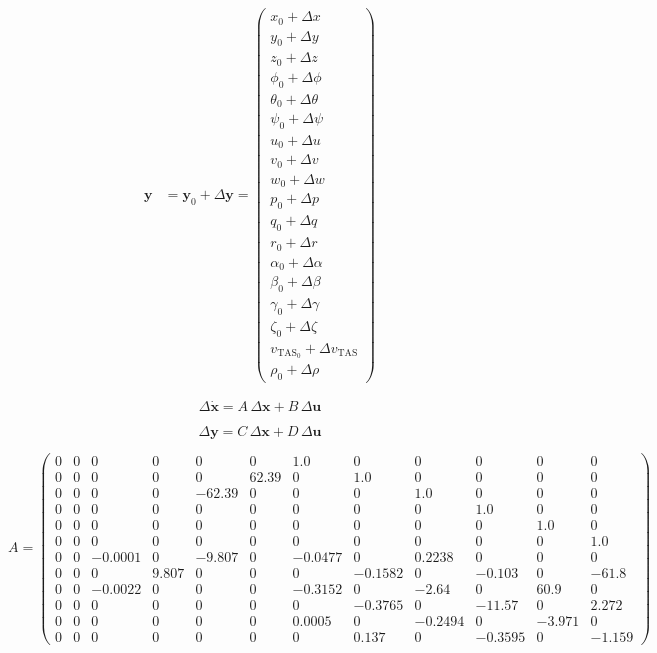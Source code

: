 \documentclass{article}
\begin{document}
\begin{dmath}
\begin{aligned}
\bm{y}&=\bm{y}_0+\Delta \bm{y}=\left(\begin{array}{c} x_0 + \Delta x\\ y_0 + \Delta y\\ z_0 + \Delta z\\ \phi_0 + \Delta \phi \\ \theta_0 + \Delta \theta \\ \psi_0 + \Delta \psi \\ u_0 + \Delta u\\ v_0 + \Delta v\\ w_0 + \Delta w\\ p_0 + \Delta p\\ q_0 + \Delta q\\ r_0 + \Delta r\\ \alpha_0 + \Delta \alpha \\ \beta_0 + \Delta \beta \\ \gamma_0 + \Delta \gamma \\ \zeta_0 + \Delta \zeta\\ v_{\mathrm{TAS}_0} + \Delta v_{\mathrm{TAS}}\\ \rho_0 + \Delta \rho  \end{array}\right)
\end{aligned}
\end{dmath}

\newpage

\begin{dmath}
\Delta \bm{\dot{x}} = A\,\Delta\bm{x} + B\,\Delta\bm{u}
\end{dmath}

\begin{dmath}
\Delta\bm{y} = C\,\Delta\bm{x} + D\,\Delta\bm{u}
\end{dmath}

\begin{dmath}
A = \left(\begin{array}{cccccccccccc} 0 & 0 & 0 & 0 & 0 & 0 & 1.0 & 0 & 0 & 0 & 0 & 0\\ 0 & 0 & 0 & 0 & 0 & 62.39 & 0 & 1.0 & 0 & 0 & 0 & 0\\ 0 & 0 & 0 & 0 & -62.39 & 0 & 0 & 0 & 1.0 & 0 & 0 & 0\\ 0 & 0 & 0 & 0 & 0 & 0 & 0 & 0 & 0 & 1.0 & 0 & 0\\ 0 & 0 & 0 & 0 & 0 & 0 & 0 & 0 & 0 & 0 & 1.0 & 0\\ 0 & 0 & 0 & 0 & 0 & 0 & 0 & 0 & 0 & 0 & 0 & 1.0\\ 0 & 0 & -0.0001 & 0 & -9.807 & 0 & -0.0477 & 0 & 0.2238 & 0 & 0 & 0\\ 0 & 0 & 0 & 9.807 & 0 & 0 & 0 & -0.1582 & 0 & -0.103 & 0 & -61.8\\ 0 & 0 & -0.0022 & 0 & 0 & 0 & -0.3152 & 0 & -2.64 & 0 & 60.9 & 0\\ 0 & 0 & 0 & 0 & 0 & 0 & 0 & -0.3765 & 0 & -11.57 & 0 & 2.272\\ 0 & 0 & 0 & 0 & 0 & 0 & 0.0005 & 0 & -0.2494 & 0 & -3.971 & 0\\ 0 & 0 & 0 & 0 & 0 & 0 & 0 & 0.137 & 0 & -0.3595 & 0 & -1.159 \end{array}\right)
\end{dmath}
\end{document}
